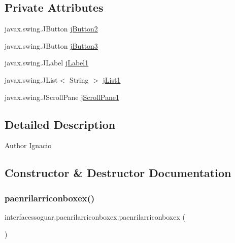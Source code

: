 \subsection*{Private Attributes}
\begin{DoxyCompactItemize}
\item 
javax.\+swing.\+J\+Button \mbox{\hyperlink{classinterfacessoguar_1_1paenrilarriconboxex_ada9e272c25f98b59277bf1cc3d87e89d}{j\+Button2}}
\item 
javax.\+swing.\+J\+Button \mbox{\hyperlink{classinterfacessoguar_1_1paenrilarriconboxex_ab9e110160eea74109e1ac28fcf342a44}{j\+Button3}}
\item 
javax.\+swing.\+J\+Label \mbox{\hyperlink{classinterfacessoguar_1_1paenrilarriconboxex_a183fb515416e9f28b873f438feb9bd96}{j\+Label1}}
\item 
javax.\+swing.\+J\+List$<$ String $>$ \mbox{\hyperlink{classinterfacessoguar_1_1paenrilarriconboxex_aafe6499bef73e1ae5162f2909227f93d}{j\+List1}}
\item 
javax.\+swing.\+J\+Scroll\+Pane \mbox{\hyperlink{classinterfacessoguar_1_1paenrilarriconboxex_a37efb18a476b6d2b02f2181ef12a7bf7}{j\+Scroll\+Pane1}}
\end{DoxyCompactItemize}


\subsection{Detailed Description}
\begin{DoxyAuthor}{Author}
Ignacio 
\end{DoxyAuthor}


\subsection{Constructor \& Destructor Documentation}
\mbox{\label{classinterfacessoguar_1_1paenrilarriconboxex_a0fef04e41b5c114819db99ee053c370e}} 
\subsubsection{\texorpdfstring{paenrilarriconboxex()}{paenrilarriconboxex()}}
{\footnotesize\ttfamily interfacessoguar.\+paenrilarriconboxex.\+paenrilarriconboxex (\begin{DoxyParamCaption}{ }\end{DoxyParamCaption})\hspace{0.3cm}{\ttfamily [inline]}}

